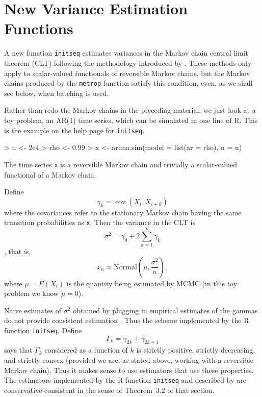 \documentclass[12pt]{article}
\DeclareMathOperator{\cov}{cov}
\begin{document}
\section{New Variance Estimation Functions}

A new function \texttt{initseq} estimates variances in the Markov chain
central limit theorem (CLT) following the methodology introduced by
\citet[Section~3.3]{practical}.  These methods only apply to scalar-valued
functionals of
reversible Markov chains, but the Markov chains produced by the \texttt{metrop}
function satisfy this condition, even, as we shall see below, when batching
is used.

Rather than redo the Markov chains in the preceding material, we just look
at a toy problem, an AR(1) time series, which can be simulated in one line
of R.  This is the example on the help page for \texttt{initseq}.
\begin{Schunk}
\begin{Sinput}
> n <- 2e4
> rho <- 0.99
> x <- arima.sim(model = list(ar = rho), n = n)
\end{Sinput}
\end{Schunk}
The time series \texttt{x} is a reversible Markov chain and trivially
a scalar-valued functional of a Markov chain.

Define
\begin{equation} \label{eq:little}
\gamma_k = \cov(X_i, X_{i + k})
\end{equation}
where the covariances refer to the stationary Markov chain having the
same transition probabilities as \texttt{x}.  Then the variance in the CLT
is
$$
\sigma^2 = \gamma_0 + 2 \sum_{k = 1}^\infty \gamma_k
$$
\citep[Theorem~2.1]{practical}, that is,
$$
\bar{x}_n \approx \text{Normal}\left(\mu, \frac{\sigma^2}{n}\right),
$$
where $\mu = E(X_i)$ is the quantity being estimated by MCMC (in this
toy problem we know $\mu = 0$).

Naive estimates of $\sigma^2$ obtained by plugging in empirical
estimates of the gammas do not provide consistent estimation
\citep[Section~3.1]{practical}.  Thus the scheme implemented
by the R function \texttt{initseq}.  Define
\begin{equation} \label{eq:big}
\Gamma_k = \gamma_{2 k} + \gamma_{2 k + 1}
\end{equation}
\citet[Theorem~3.1]{practical} says that $\Gamma_k$ considered as a function
of $k$ is strictly positive, strictly decreasing, and strictly convex
(provided we are, as stated above, working with a reversible Markov chain).
Thus it makes sense to use estimators that use these properties.
The estimators implemented by the R function \texttt{initseq} and
described by \citet[Section~3.3]{practical} are conservative-consistent
in the sense of Theorem~3.2 of that section.
\end{document}
